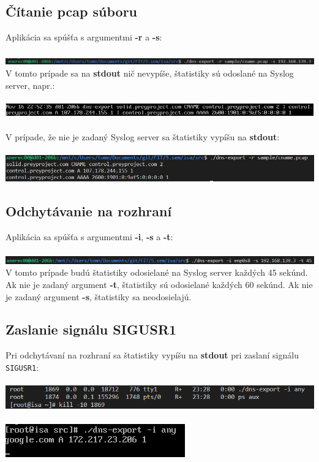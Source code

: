 \documentclass{article}
\begin{document}
        \subsection{Čítanie pcap súboru}
        \noindent
        Aplikácia sa spúšťa s argumentmi \textbf{-r} a \textbf{-s}:\\\\
        \includegraphics[scale=0.6]{r1.png}
        V tomto prípade sa na \textbf{stdout} nič nevypíše, štatistiky sú odoslané na Syslog server, napr.:\\\\
        \includegraphics[scale=0.6]{r2.png}\\\\
        V prípade, že nie je zadaný Syslog server sa štatistiky vypíšu na \textbf{stdout}:\\\\
        \includegraphics[scale=0.6]{r3.png}

        \subsection{Odchytávanie na rozhraní}
        \noindent
        Aplikácia sa spúšťa s argumentmi \textbf{-i}, \textbf{-s} a \textbf{-t}:\\\\
        \includegraphics[scale=0.6]{i1.png}
        V tomto prípade budú štatistiky odosielané na Syslog server každých 45 sekúnd. Ak nie je zadaný argument \textbf{-t},
        štatistiky sú odosielané každých 60 sekúnd. Ak nie je zadaný argument \textbf{-s}, štatistiky sa neodosielajú.

        \subsection{Zaslanie signálu SIGUSR1}
        \noindent
        Pri odchytávaní na rozhraní sa štatistiky vypíšu na \textbf{stdout} pri zaslaní signálu \texttt{SIGUSR1}:\\\\
        \includegraphics[scale=0.6]{i2.png}\\\\
        \includegraphics[scale=0.6]{i3.png}
\end{document}

